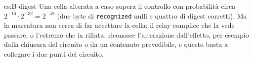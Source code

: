 \begin{soluzione}{es:B-digest}
Una cella alterata a caso supera il controllo con probabilità circa $2^{-16} \cdot 2^{-32} = 2^{-48}$ (due byte di \texttt{recognized} nulli e quattro di digest corretti). Ma la marcatura non cerca di far accettare la cella: il relay complice che la vede passare, o l'estremo che la rifiuta, riconosce l'alterazione dall'effetto, per esempio dalla chiusura del circuito o da un contenuto prevedibile, e questo basta a collegare i due punti del circuito.
\end{soluzione}
